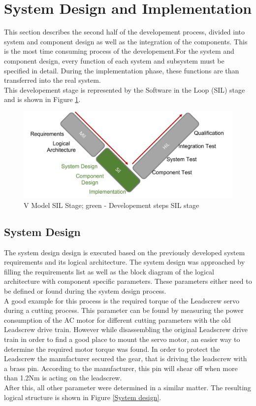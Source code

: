 \section{System Design and Implementation}
This section describes the second half of the developement process, divided into system and component design as well as the integration of the components. This is the most time consuming process of the developement.For the system and component design, every function of each system and subsystem must be specified in detail. During the implementation phase, these functions are than transferred into the real system.\\
This developement stage is represented by the Software in the Loop (SIL) stage and is shown in Figure \ref{V Model System Design}.

\begin{figure}
    \begin{center}
    \includegraphics[width=12cm]{Pictures/V Model System Design.png}
    \caption[V Model System Design]{V Model SIL Stage; green - Developement steps SIL stage}
    \label{V Model System Design}
    \end{center}
\end{figure}

\subsection{System Design}

The system design design is executed based on the previously developed system requirements and its logical architecture. The system design was approached by filling the requirements list as well as the block diagram of the logical architecture with component specific parameters. These parameters either need to be defined or found during the system design process.\\
A good example for this process is the required torque of the Leadscrew servo during a cutting process. This parameter can be found by measuring the power consumption of the AC motor for different cutting parameters with the old Leadscrew drive train. However while disassembling the original Leadscrew drive train in order to find a good place to mount the servo motor, an easier way to determine the required motor torque was found. In order to protect the Leadscrew the manufacturer secured the gear, that is driving the leadscrew with a brass pin. According to the manufacturer, this pin will shear off when more than 1.2Nm is acting on the leadscrew.\\
After this, all other parameter were determined in a similar matter. The resulting logical structure is shown in Figure \ref{System design}.

